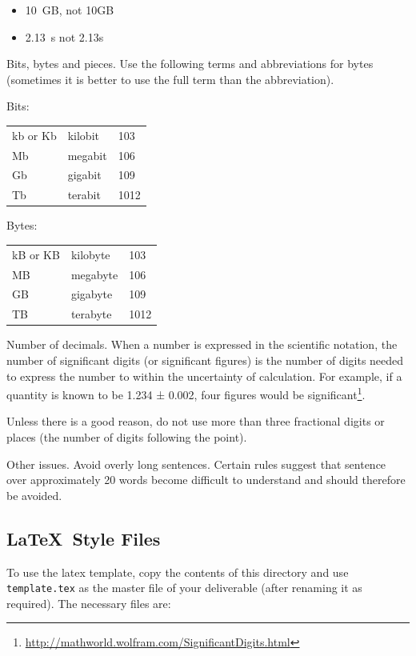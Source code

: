 \begin{itemize}
    \item 10~GB, not 10GB
    \item 2.13~s not 2.13s
\end{itemize}

Bits, bytes and pieces. Use the following terms and abbreviations for bytes (sometimes it is better to use the full term than the abbreviation).

Bits:\\
\begin{tabular}{lll}
    kb or Kb&	kilobit&	103\\ 
    Mb&	megabit&	106\\ 
    Gb&	gigabit&	109\\ 
    Tb&	terabit&	1012\\ 
\end{tabular}

Bytes:\\
\begin{tabular}{lll}
    kB or KB&	kilobyte&	103\\ 
    MB&	megabyte&106\\ 
    GB	&gigabyte	&109\\ 
    TB	&terabyte	&1012\\ 
\end{tabular}

Number of decimals. When a number is expressed in the scientific notation, the number of significant digits (or significant figures) is the number of digits needed to express the number to within the uncertainty of calculation. For example, if a quantity is known to be 1.234 ± 0.002, four figures would be significant\footnote{\url{http://mathworld.wolfram.com/SignificantDigits.html}}.

Unless there is a good reason, do not use more than three fractional digits or places (the number of digits following the point).

Other issues. Avoid overly long sentences. Certain rules suggest that sentence over approximately 20 words become difficult to understand and should therefore be avoided. 

\subsection{\LaTeX\ Style Files}
\label{sec:latex-style-files}

\newcommand{\macro}[1]{{\tt \textbackslash #1}}

To use the latex template, copy the contents of this directory and use {\tt template.tex} as the master file of your deliverable (after renaming it as required). The necessary files are:


